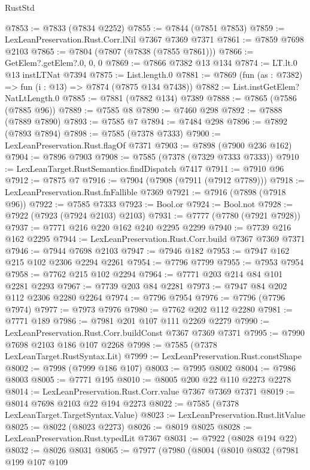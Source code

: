 \begin{lexlean}{RustStd}
\begin{coremodule}
@7853 := @7833 (@7834 @2252)
@7855 := @7844 (@7851 @7853)
@7859 := LexLeanPreservation.Rust.Corr.lNil @7367 @7369 @7371
@7861 := @7859 @7698 @2103
@7865 := @7804 (@7807 (@7838 (@7855 @7861)))
@7866 := GetElem?.getElem?.{0, 0, 0}
@7869 := @7866 @7382 @13 @134
@7874 := LT.lt.{0} @13 instLTNat @7394
@7875 := List.length.{0}
@7881 := @7869 (fun (as : @7382) => fun (i : @13) => @7874 (@7875 @134 @7438))
@7882 := List.instGetElem?NatLtLength.{0}
@7885 := @7881 (@7882 @134) @7389
@7888 := @7865 (@7586 (@7885 @96))
@7889 := @7585 @8
@7890 := @7460 @298
@7892 := @7888 (@7889 @7890)
@7893 := @7585 @7
@7894 := @7484 @298
@7896 := @7892 (@7893 @7894)
@7898 := @7585 (@7378 @7333)
@7900 := LexLeanPreservation.Rust.flagOf @7371
@7903 := @7898 (@7900 @236 @162)
@7904 := @7896 @7903
@7908 := @7585 (@7378 (@7329 @7333 @7333))
@7910 := LexLeanTarget.RustSemantics.findDispatch @7417
@7911 := @7910 @96
@7912 := @7875 @7
@7916 := @7904 (@7908 (@7911 (@7912 @7789)))
@7918 := LexLeanPreservation.Rust.fnFallible @7369
@7921 := @7916 (@7898 (@7918 @96))
@7922 := @7585 @7333
@7923 := Bool.or
@7924 := Bool.not
@7928 := @7922 (@7923 (@7924 @2103) @2103)
@7931 := @7777 (@7780 (@7921 @7928))
@7937 := @7771 @216 @220 @162 @240 @2295 @2299
@7940 := @7739 @216 @162 @2295
@7944 := LexLeanPreservation.Rust.Corr.build @7367 @7369 @7371
@7946 := @7944 @7698 @2103
@7947 := @7946 @182
@7953 := @7947 @162 @215 @102 @2306 @2294 @2261
@7954 := @7796 @7799
@7955 := @7953 @7954
@7958 := @7762 @215 @102 @2294
@7964 := @7771 @203 @214 @84 @101 @2281 @2293
@7967 := @7739 @203 @84 @2281
@7973 := @7947 @84 @202 @112 @2306 @2280 @2264
@7974 := @7796 @7954
@7976 := @7796 (@7796 @7974)
@7977 := @7973 @7976
@7980 := @7762 @202 @112 @2280
@7981 := @7771 @189
@7986 := @7981 @201 @107 @111 @2269 @2279
@7990 := LexLeanPreservation.Rust.Corr.buildConst @7367 @7369 @7371
@7995 := @7990 @7698 @2103 @186 @107 @2268
@7998 := @7585 (@7378 LexLeanTarget.RustSyntax.Lit)
@7999 := LexLeanPreservation.Rust.constShape
@8002 := @7998 (@7999 @186 @107)
@8003 := @7995 @8002
@8004 := @7986 @8003
@8005 := @7771 @195
@8010 := @8005 @200 @22 @110 @2273 @2278
@8014 := LexLeanPreservation.Rust.Corr.value @7367 @7369 @7371
@8019 := @8014 @7698 @2103 @22 @194 @2273
@8022 := @7585 (@7378 LexLeanTarget.TargetSyntax.Value)
@8023 := LexLeanPreservation.Rust.litValue
@8025 := @8022 (@8023 @2273)
@8026 := @8019 @8025
@8028 := LexLeanPreservation.Rust.typedLit @7367
@8031 := @7922 (@8028 @194 @22)
@8032 := @8026 @8031
@8065 := @7977
    (@7980
      (@8004
        (@8010
          @8032
          (@7981
            @199
            @107
            @109

\end{coremodule}
\end{lexlean}

